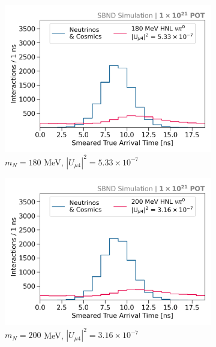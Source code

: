 \begin{figure}[htbp!]
        \begin{subfigure}[b]{0.495\textwidth}
            \includegraphics[width=\textwidth]{m180}
            \caption{$m_N = 180$ MeV, $|U_{\mu4}|^2 = 5.33 \times 10^{-7}$ }
        \end{subfigure}
        \begin{subfigure}[b]{0.495\textwidth}
            \includegraphics[width=\textwidth]{m200}
            \caption{$m_N = 200$ MeV, $|U_{\mu4}|^2 = 3.16 \times 10^{-7}$ }
        \end{subfigure}
        \begin{subfigure}[b]{0.495\textwidth}

\end{subfigure}
\end{figure}
